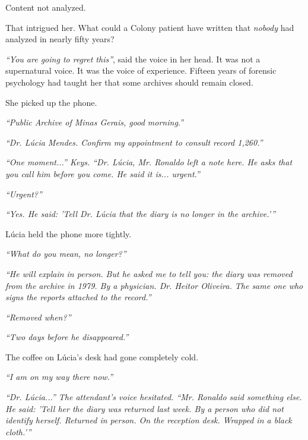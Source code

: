 \noindent Content not analyzed.

\noindent That intrigued her. What could a Colony patient have written that \textit{nobody} had analyzed in nearly fifty years?

\noindent \textit{\textquotedblleft{}You are going to regret this\textquotedblright{}}, said the voice in her head. It was not a supernatural voice. It was the voice of experience. Fifteen years of forensic psychology had taught her that some archives should remain closed.

\noindent She picked up the phone.

\noindent \textit{\textquotedblleft{}Public Archive of Minas Gerais, good morning.\textquotedblright{}}

\noindent \textit{\textquotedblleft{}Dr. Lúcia Mendes. Confirm my appointment to consult record 1,260.\textquotedblright{}}

\noindent \textit{\textquotedblleft{}One moment...\textquotedblright{}\textit{ Keys. }\textquotedblleft{}Dr. Lúcia, Mr. Ronaldo left a note here. He asks that you call him before you come. He said it is... urgent.\textquotedblright{}}

\noindent \textit{\textquotedblleft{}Urgent?\textquotedblright{}}

\noindent \textit{\textquotedblleft{}Yes. He said: 'Tell Dr. Lúcia that the diary is no longer in the archive.'\textquotedblright{}}

\noindent Lúcia held the phone more tightly.

\noindent \textit{\textquotedblleft{}What do you mean, no longer?\textquotedblright{}}

\noindent \textit{\textquotedblleft{}He will explain in person. But he asked me to tell you: the diary was removed from the archive in 1979. By a physician. Dr. Heitor Oliveira. The same one who signs the reports attached to the record.\textquotedblright{}}

\noindent \textit{\textquotedblleft{}Removed when?\textquotedblright{}}

\noindent \textit{\textquotedblleft{}Two days before he disappeared.\textquotedblright{}}

\noindent The coffee on Lúcia's desk had gone completely cold.

\noindent \textit{\textquotedblleft{}I am on my way there now.\textquotedblright{}}

\noindent \textit{\textquotedblleft{}Dr. Lúcia...\textquotedblright{}\textit{ The attendant's voice hesitated. }\textquotedblleft{}Mr. Ronaldo said something else. He said: 'Tell her the diary was returned last week. By a person who did not identify herself. Returned in person. On the reception desk. Wrapped in a black cloth.'\textquotedblright{}}

